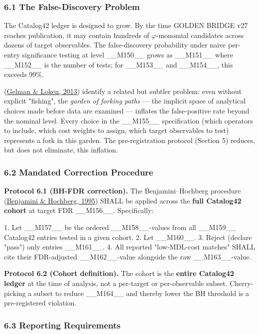 \subsubsection{6.1 The False-Discovery Problem}

The Catalog42 ledger is designed to grow. By the time GOLDEN BRIDGE v27 reaches publication, it may contain hundreds of $\varphi$-monomial candidates across dozens of target observables. The false-discovery probability under naive per-entry significance testing at level \_\_M150\_\_ grows as \_\_M151\_\_ where \_\_M152\_\_ is the number of tests; for \_\_M153\_\_ and \_\_M154\_\_, this exceeds 99\%.

(\href{https://sites.stat.columbia.edu/gelman/research/unpublished/forking.pdf}{Gelman \& Loken, 2013}) identify a related but subtler problem: even without explicit "fishing", the \textit{garden of forking paths} --- the implicit space of analytical choices made before data are examined --- inflates the false-positive rate beyond the nominal level. Every choice in the \_\_M155\_\_ specification (which operators to include, which cost weights to assign, which target observables to test) represents a fork in this garden. The pre-registration protocol (Section 5) reduces, but does not eliminate, this inflation.

\subsubsection{6.2 Mandated Correction Procedure}

\textbf{Protocol 6.1 (BH-FDR correction).} The Benjamini--Hochberg procedure (\href{https://www.jstor.org/stable/2346101}{Benjamini \& Hochberg, 1995}) SHALL be applied across the \textbf{full Catalog42 cohort} at target FDR \_\_M156\_\_. Specifically:

1. Let \_\_M157\_\_ be the ordered \_\_M158\_\_-values from all \_\_M159\_\_ Catalog42 entries tested in a given cohort.
2. Let \_\_M160\_\_.
3. Reject (declare "pass") only entries \_\_M161\_\_.
4. All reported "low-MDL-cost matches" SHALL cite their FDR-adjusted \_\_M162\_\_-value alongside the raw \_\_M163\_\_-value.

\textbf{Protocol 6.2 (Cohort definition).} The cohort is the \textbf{entire Catalog42 ledger} at the time of analysis, not a per-target or per-observable subset. Cherry-picking a subset to reduce \_\_M164\_\_ and thereby lower the BH threshold is a pre-registered violation.

\subsubsection{6.3 Reporting Requirements}

